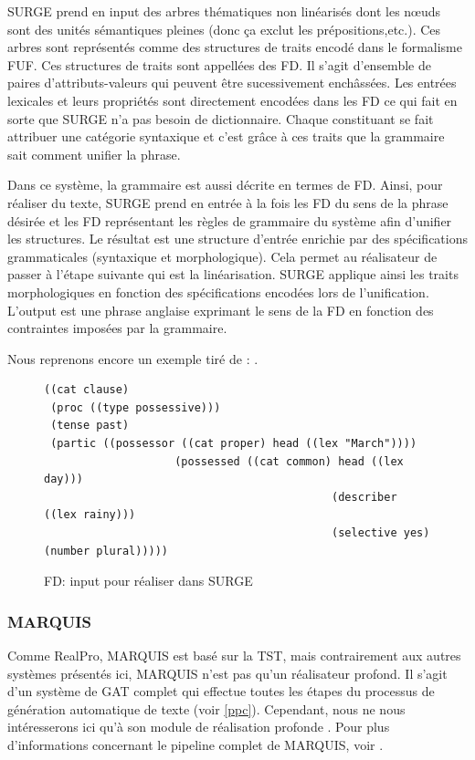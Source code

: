 SURGE prend en input des arbres thématiques non linéarisés dont les n\oe{}uds sont des unités sémantiques pleines (donc ça exclut les prépositions,etc.). Ces arbres sont représentés comme des structures de traits encodé dans le formalisme \ac{FUF}. Ces structures de traits sont appellées des \ac{FD}. Il s'agit d'ensemble de paires d'attributs-valeurs qui peuvent être sucessivement enchâssées. Les entrées lexicales et leurs propriétés sont directement encodées dans les \ac{FD} ce qui fait en sorte que SURGE n'a pas besoin de dictionnaire. Chaque constituant se fait attribuer une catégorie syntaxique et c'est grâce à ces traits que la grammaire sait comment unifier la phrase.

Dans ce système, la grammaire est aussi décrite en termes de \ac{FD}. Ainsi, pour réaliser du texte, SURGE prend en entrée à la fois les \ac{FD} du sens de la phrase désirée et les \ac{FD} représentant les règles de grammaire du système afin d'unifier les structures. Le résultat est une structure d'entrée enrichie par des spécifications grammaticales (syntaxique et morphologique). Cela permet au réalisateur de passer à l'étape suivante qui est la linéarisation. SURGE applique ainsi les traits morphologiques en fonction des spécifications encodées lors de l'unification. L'output est une phrase anglaise exprimant le sens de la \ac{FD} en fonction des contraintes imposées par la grammaire.

Nous reprenons encore un exemple tiré de \cite{ReiterBuildingNaturalLanguage2000}: .

\begin{figure}[htb]
 \caption{FD: input pour réaliser  dans SURGE}
 \label{surge}
\begin{lstlisting}[language=mate]
((cat clause)
 (proc ((type possessive)))
 (tense past)
 (partic ((possessor ((cat proper) head ((lex "March"))))
					(possessed ((cat common) head ((lex day)))
											(describer ((lex rainy)))
											(selective yes) (number plural)))))
\end{lstlisting}
\end{figure}

\subsubsection{MARQUIS}\label{sectionmarquis}
Comme RealPro, MARQUIS est basé sur la \ac{TST}, mais contrairement aux autres systèmes présentés ici, MARQUIS n'est pas qu'un réalisateur profond. Il s'agit d'un système de \ac{GAT} complet qui effectue toutes les étapes du processus de génération automatique de texte (voir \ref{ppc}). Cependant, nous ne nous intéresserons ici qu'à son module de réalisation profonde \citep{Lareau2007TowardsAG}. Pour plus d'informations concernant le pipeline complet de MARQUIS, voir \citep{WannerMARQUISGENERATIONUSERTAILORED2010,bohnet07}. 

